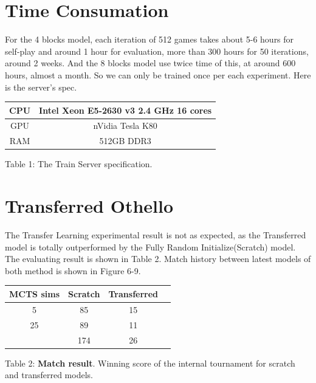 \documentclass[12pt,a4paper]{report}
\begin{document}
\section{Time Consumation}
\hspace{0.6cm} For the 4 blocks model, each iteration of 512 games takes about 5-6 hours for self-play and around 1 hour for evaluation, more than 300 hours for 50 iterations, around 2 weeks. And the 8 blocks model use twice time of this, at around 600 hours, almost a month. So we can only be trained once per each experiment. Here is the server's spec.
{
\begin{center}
\begin{tabular}{ |c|c| }
\hline
CPU & Intel Xeon E5-2630 v3 2.4 GHz 16 cores \\
\hline
GPU & nVidia Tesla K80  \\
\hline
RAM & 512GB DDR3  \\
\hline
\end{tabular}\par
\begin{small}
Table 1: The Train Server specification.
\end{small}
\end{center}
}
\section{Transferred Othello}
\hspace{0.6cm}The Transfer Learning experimental result is not as expected, as the Transferred model is totally outperformed by the Fully Random Initialize(Scratch) model. The evaluating result is shown in Table 2. Match history between latest models of both method is shown in Figure 6-9.
{
\begin{center}
\begin{tabular}{ |c|c|c|c| }
\hline
MCTS sims & Scratch & Transferred \\
\hline
5         & 85      & 15           \\
\hline
25        & 89      & 11           \\
\hline
           & 174     & 26           \\
\hline
\end{tabular}\par
\begin{small}
Table 2: \textbf{Match result}. Winning score of the internal tournament for scratch and transferred models.
\end{small}
\end{center}
}
\end{document}
